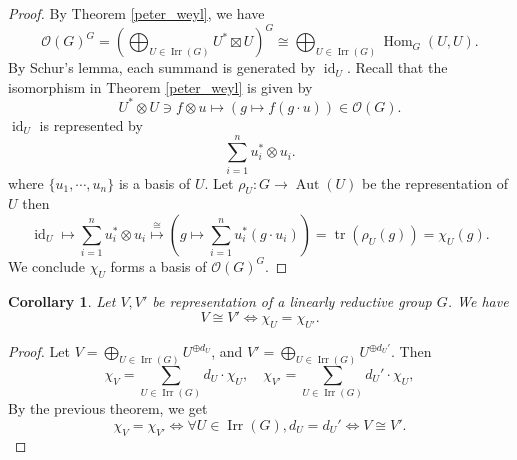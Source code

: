 \documentclass[10pt]{article}
\newtheorem{corollary}{Corollary} [section]
\numberwithin{equation}{theorem}
\DeclareMathOperator{\tr}{tr}
\DeclareMathOperator{\Aut}{Aut}
\DeclareMathOperator{\Irr}{Irr}
\DeclareMathOperator{\Hom}{Hom}
\DeclareMathOperator{\id}{id}
\newcommand{\Ouv}[0]{\mathcal{O}}
\begin{document}
\begin{proof}
  By Theorem \ref{peter_weyl}, we have 
  \begin{equation*}
    \Ouv(G)^G = \left(\bigoplus_{U\in\Irr(G)} U^*\boxtimes U\right)^G \cong\bigoplus_{U\in\Irr(G)}\Hom_G(U,U).
  \end{equation*}
  By Schur's lemma, each summand is generated by $\id_U$. Recall that the isomorphism in Theorem \ref{peter_weyl} is given by 
  \begin{equation*}
    U^*\otimes U\ni f\otimes u\mapsto (g\mapsto f(g\cdot u))\in\Ouv(G).
  \end{equation*}
  $\id_U$ is represented by 
  \begin{equation*}
    \sum_{i=1}^n u_i^*\otimes u_i.
  \end{equation*}
  where $\{u_1,\cdots,u_n\}$ is a basis of $U$. Let $\rho_U:G\to \Aut(U)$ be the representation of $U$ then
  \begin{equation*}
    \id_U\mapsto \sum_{i=1}^n u_i^*\otimes u_i\stackrel{\cong}{\mapsto}\left(g\mapsto \sum_{i=1}^n u_i^*(g\cdot u_i)\right) = \tr(\rho_U(g)) = \chi_U(g).
  \end{equation*}
  We conclude $\chi_U$ forms a basis of $\Ouv(G)^G$.
\end{proof}
\begin{corollary}
  Let $V,V'$ be representation of a linearly reductive group $G$. We have
  \begin{equation*}
    V\cong V' \Leftrightarrow \chi_U = \chi_{U'}.
  \end{equation*}
\end{corollary}
\begin{proof}
  Let $V = \bigoplus_{U\in\Irr(G)}U^{\oplus d_U}$, and $V' = \bigoplus_{U\in\Irr(G)}U^{\oplus d_U'}$. Then 
  \begin{equation*}
    \chi_V = \sum_{U\in\Irr(G)}d_U\cdot \chi_U, \quad \chi_{V'} = \sum_{U\in\Irr(G)}d_U'\cdot \chi_U,
  \end{equation*}
  By the previous theorem, we get 
  \begin{equation*}
    \chi_V =\chi_{V'}\Leftrightarrow \forall U\in\Irr(G), d_U = d_U' \Leftrightarrow V\cong V'.
  \end{equation*}
\end{proof}
\end{document}
